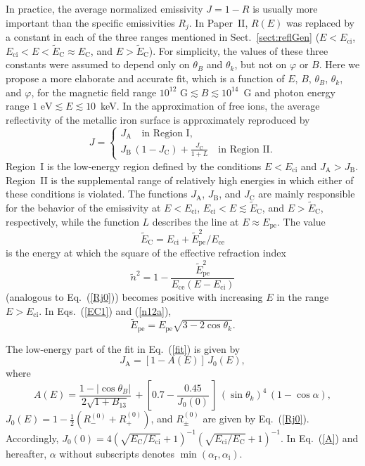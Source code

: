\documentclass{aa}
\newcommand{\beq}{\begin{equation}}
\newcommand{\eeq}{\end{equation}}
\newcommand{\req}[1]{Eq.~(\ref{#1})}
\newcommand{\EC}{E_\mathrm{C}}
\newcommand{\Ece}{E_\mathrm{ce}}
\newcommand{\Eci}{E_\mathrm{ci}}
\newcommand{\Epe}{E_\mathrm{pe}}
\newcommand{\tEC}{\tilde{E}_\mathrm{C}}
\newcommand{\tEpe}{\tilde{E}_\mathrm{pe}}
\begin{document}
In practice, the average normalized emissivity $J=1-R$ is
usually more important than the specific emissivities $R_j$.
In Paper~II, $R(E)$ was replaced  by a constant in each of
the three ranges mentioned in Sect.~\ref{sect:reflGen}
($E<\Eci$, $\Eci<E<\tEC\approx\EC$, and $E>\tEC$).
For simplicity, the values of these three constants were
assumed to depend only on $\theta_B$ and $\theta_k$, but not
on $\varphi$ or $B$. Here we propose a more elaborate and
accurate fit, which is a function of $E$,
$B$, $\theta_B$, $\theta_k$, and $\varphi$, for the
magnetic field range $10^{12}\mbox{~G}\lesssim B \lesssim
10^{14}$~G and photon energy range $\mbox{1~eV}\lesssim E
\lesssim 10$~keV.  In the approximation of free ions, the
average reflectivity of the metallic iron surface is
approximately reproduced by
\beq
   J = \left\{ \begin{array}{l}
   J_\mathrm{A}
    \quad
    \mbox{in Region~I},
    \\
    \displaystyle
    J_\mathrm{B}\,(1-J_\mathrm{C})    
     + \frac{J_\mathrm{C}}{1+{L}}
    \quad\textrm{in Region~II}.
    \end{array} \right.
\label{fit}
\eeq
Region~I is the low-energy region defined by the conditions
$E<\Eci$ and $J_\mathrm{A} > J_\mathrm{B}$. 
Region~II is the supplemental range of relatively high
energies in which either of these conditions is violated.
The functions $J_\mathrm{A}$, $J_\mathrm{B}$, and $J_\mathrm{C}$
are mainly responsible for the behavior 
of the emissivity at $E < \Eci$, $\Eci < E \lesssim \tEC$,
and $E > \tEC$, respectively, while the function ${L}$
describes the line at $E\approx\Epe$.  The value 
\beq
   \tEC = \Eci + \tEpe^2/\Ece
\label{EC1}
\eeq
is the energy at which
the square of the effective refraction index 
\beq
  \tilde{n}^2 =  
    1 - \frac{\tEpe^2}{\Ece(E-\Eci)}
\label{n12a}
\eeq
(analogous to \req{Rj0})
becomes positive with increasing $E$
in the range $E>\Eci$.
In Eqs.~(\ref{EC1}) and (\ref{n12a}),
\beq
   \tEpe = \Epe \sqrt{
      3-2\cos\theta_k
        }.
\eeq

The low-energy part of the fit in \req{fit} is given by
\beq
   J_\mathrm{A}=[1-A(E)]\,J_0(E),
\eeq
where
\beq
  A(E) = \frac{1-|\cos\theta_B|}{2\sqrt{1+B_{13}}}\,
       +  \left[
       0.7-\frac{0.45}{J_0(0)}\,
       \right]
          \,(\sin\theta_k)^4\,(1-\cos\alpha),
\label{A}
\eeq
$J_0(E)=1-\frac12(R_-^{(0)}+R_+^{(0)})$,
and $R_\pm^{(0)}$ are given by \req{Rj0}.
Accordingly, 
$J_0(0) = 4\left(\sqrt{\EC/\Eci}+1\right)^{-1}
\left(\sqrt{\Eci/\EC}+1\right)^{-1}$.
In \req{A} and hereafter, $\alpha$ without subscripts denotes
$
   \min(\alpha_\mathrm{r},\alpha_\mathrm{i}).
$
\end{document}

